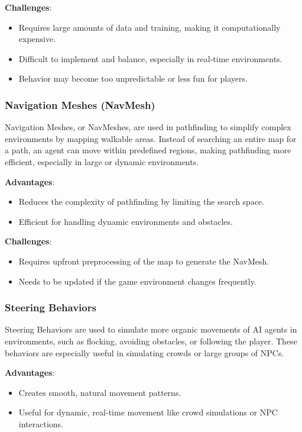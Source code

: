 \textbf{Challenges}:
\begin{itemize}
    \item Requires large amounts of data and training, making it computationally expensive.
    \item Difficult to implement and balance, especially in real-time environments.
    \item Behavior may become too unpredictable or less fun for players.
\end{itemize}

\subsubsection{Navigation Meshes (NavMesh)}

Navigation Meshes, or NavMeshes, are used in pathfinding to simplify complex environments by mapping walkable areas. Instead of searching an entire map for a path, an agent can move within predefined regions, making pathfinding more efficient, especially in large or dynamic environments.

\textbf{Advantages}:
\begin{itemize}
    \item Reduces the complexity of pathfinding by limiting the search space.
    \item Efficient for handling dynamic environments and obstacles.
\end{itemize}

\textbf{Challenges}:
\begin{itemize}
    \item Requires upfront preprocessing of the map to generate the NavMesh.
    \item Needs to be updated if the game environment changes frequently.
\end{itemize}

\subsubsection{Steering Behaviors}

Steering Behaviors are used to simulate more organic movements of AI agents in environments, such as flocking, avoiding obstacles, or following the player. These behaviors are especially useful in simulating crowds or large groups of NPCs.

\textbf{Advantages}:
\begin{itemize}
    \item Creates smooth, natural movement patterns.
    \item Useful for dynamic, real-time movement like crowd simulations or NPC interactions.
\end{itemize}

